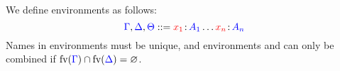 \begin{definition}[Environments]\label{def:nc-environments}
  We define environments as follows:
  \[
    \textcolor{blue}{\Gamma}, \textcolor{blue}{\Delta}, \textcolor{blue}{\Theta}
    ::= \textcolor{red}{x_1}\colon\!\textcolor{blue}{A_1}\dots\textcolor{red}{x_n}\colon\!\textcolor{blue}{A_n}
  \] 
  Names in environments must be unique, and environments \ty{\Gamma} and
  \ty{\Delta} can only be combined if
  $\text{fv}(\textcolor{blue}{\Gamma}) \cap \text{fv}(\textcolor{blue}{\Delta}) = \varnothing$.
\end{definition}
